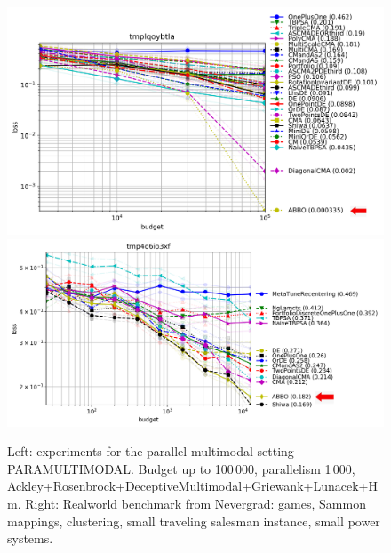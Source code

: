 \begin{figure}[t!]
\centering
\includegraphics[trim={0 0 0 54},clip,width=.49\linewidth]{sections/appendix/h220benchmarks/benchmark/xp_paramultimodal.png}
\includegraphics[trim={0 0 0 21},clip,width=.49\linewidth]{sections/appendix/h220benchmarks/benchmark/xp_realworld.png}

	\caption{Left: experiments for the parallel multimodal setting PARAMULTIMODAL. Budget up to 100\,000, parallelism 1\,000, Ackley+Rosenbrock+DeceptiveMultimodal+Griewank+Lunacek+Hm. Right: Realworld benchmark from Nevergrad: games, Sammon mappings, clustering, small traveling salesman instance, small power systems.}\label{figrw}
\end{figure}

